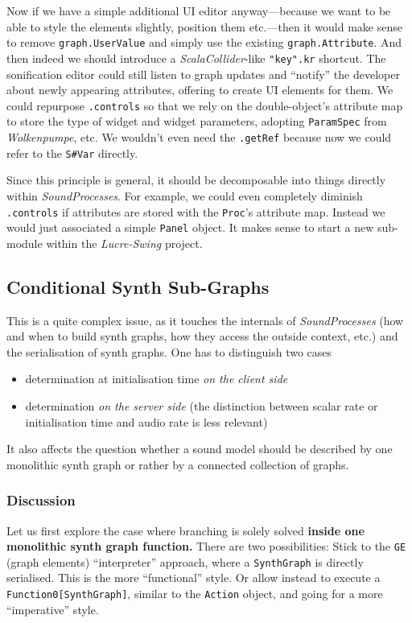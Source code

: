 \documentclass[11pt,a4paper]{article}
\newcommand{\software}[1]{\textit{#1}}
\begin{document}
Now if we have a simple additional UI editor anyway---because we want to be able to style the elements slightly, position them etc.---then it would make sense to remove \verb!graph.UserValue! and simply use the existing \verb!graph.Attribute!. And then indeed we should introduce a \software{ScalaCollider}-like \verb!"key".kr! shortcut. The sonification editor could still listen to graph updates and ``notify'' the developer about newly appearing attributes, offering to create UI elements for them. We could repurpose \verb!.controls! so that we rely on the double-object's attribute map to store the type of widget and widget parameters, adopting \verb!ParamSpec! from \software{Wolkenpumpe}, etc. We wouldn't even need the \verb!.getRef! because now we could refer to the \verb!S#Var! directly.

Since this principle is general, it should be decomposable into things directly within \software{SoundProcesses}. For example, we could even completely diminish \verb!.controls! if attributes are stored with the \verb!Proc!'s attribute map. Instead we would just associated a simple \verb!Panel! object. It makes sense to start a new sub-module within the \software{Lucre-Swing} project.

\subsection{Conditional Synth Sub-Graphs}

This is a quite complex issue, as it touches the internals of \software{SoundProcesses} (how and when to build synth graphs, how they access the outside context, etc.) and the serialisation of synth graphs. One has to distinguish two cases
%
\begin{itemize}
\item determination at initialisation time \emph{on the client side}
\item determination \emph{on the server side} (the distinction between scalar rate or initialisation time and audio rate is less relevant)
\end{itemize}
%
It also affects the question whether a sound model should be described by one monolithic synth graph or rather by a connected collection of graphs.

\subsubsection*{Discussion}

Let us first explore the case where branching is solely solved \textbf{inside one monolithic synth graph function.} There are two possibilities: Stick to the \verb!GE! (graph elements) ``interpreter'' approach, where a \verb!SynthGraph! is directly serialised. This is the more ``functional'' style. Or allow instead to execute a \verb!Function0[SynthGraph]!, similar to the \verb!Action! object, and going for a more ``imperative'' style.
\end{document}
